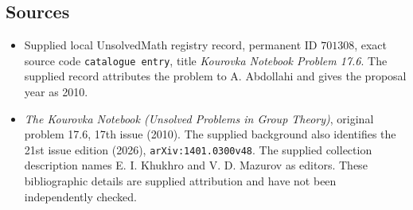 \documentclass[11pt]{article}
\begin{document}
\subsection{Sources}
\begin{itemize}
\item Supplied local UnsolvedMath registry record, permanent ID \(701308\), exact source code \texttt{catalogue entry}, title \emph{Kourovka Notebook Problem 17.6}. The supplied record attributes the problem to A. Abdollahi and gives the proposal year as 2010.
\item \emph{The Kourovka Notebook (Unsolved Problems in Group Theory)}, original problem 17.6, 17th issue (2010). The supplied background also identifies the 21st issue edition (2026), \texttt{arXiv:1401.0300v48}. The supplied collection description names E. I. Khukhro and V. D. Mazurov as editors. These bibliographic details are supplied attribution and have not been independently checked.
\end{itemize}
\end{document}
